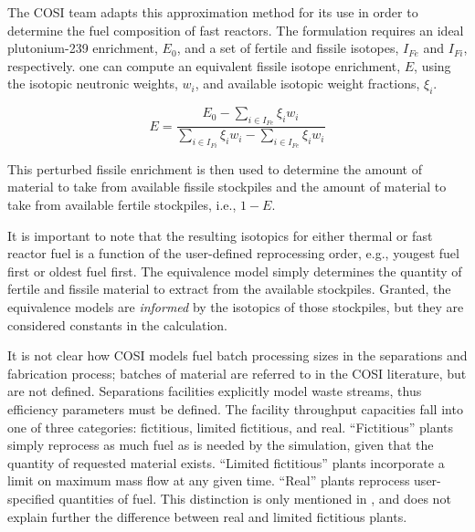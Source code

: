 The COSI team adapts this approximation method for its use in order to determine
the fuel composition of fast reactors. The formulation requires an ideal
plutonium-239 enrichment, $E_0$, and a set of fertile and fissile isotopes,
$I_{Fe}$ and $I_{Fi}$, respectively. one can compute an equivalent fissile
isotope enrichment, $E$, using the isotopic neutronic weights, $w_i$, and
available isotopic weight fractions, $\xi_i$.

\begin{equation}
E = \frac{E_0 - \sum_{i \in I_{Fe}} \xi_i w_i}
         {\sum_{i \in I_{Fi}} \xi_i w_i - \sum_{i \in I_{Fe}} \xi_i w_i}
\end{equation}

This perturbed fissile enrichment is then used to determine the amount of
material to take from available fissile stockpiles and the amount of material to
take from available fertile stockpiles, i.e., $1 - E$.

It is important to note that the resulting isotopics for either thermal or fast
reactor fuel is a function of the user-defined reprocessing order, e.g., yougest
fuel first or oldest fuel first. The equivalence model simply determines the
quantity of fertile and fissile material to extract from the available
stockpiles. Granted, the equivalence models are \textit{informed} by the
isotopics of those stockpiles, but they are considered constants in the
calculation.

It is not clear how COSI models fuel batch processing sizes in the separations
and fabrication process; batches of material are referred to in the COSI
literature, but are not defined.  Separations facilities explicitly model waste
streams, thus efficiency parameters must be defined. The facility throughput
capacities fall into one of three categories: fictitious, limited fictitious,
and real. ``Fictitious'' plants simply reprocess as much fuel as is needed by
the simulation, given that the quantity of requested material exists. ``Limited
fictitious'' plants incorporate a limit on maximum mass flow at any given
time. ``Real'' plants reprocess user-specified quantities of fuel. This
distinction is only mentioned in \cite{guerin_benchmark_2009}, and does not
explain further the difference between real and limited fictitious plants.

